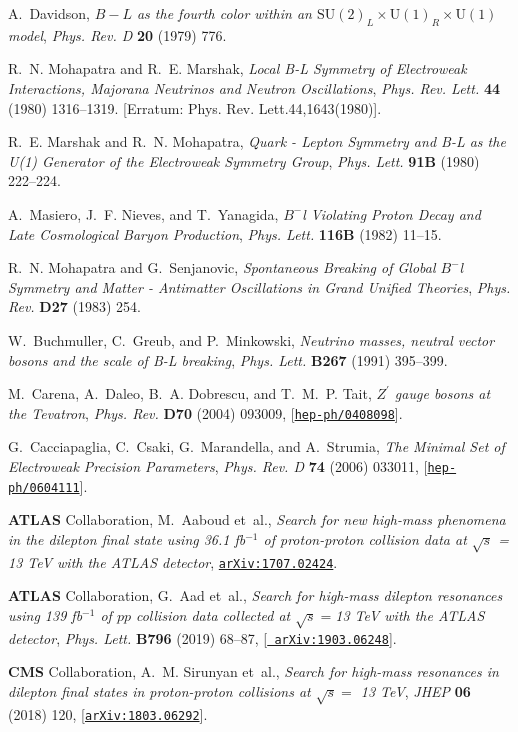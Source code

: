 \documentclass[prd,nofootinbib,preprint,superscriptaddress]{revtex4}
\begin{document}
\begin{thebibliography}{100}
A.~Davidson, {\it {$B−L$ as the fourth color within an $\mathrm{SU}(2)_L
  \times \mathrm{U}(1)_R \times \mathrm{U}(1)$ model}},  {\em Phys. Rev. D}
  {\bf 20} (1979) 776.

R.~N. Mohapatra and R.~E. Marshak, {\it {Local B-L Symmetry of Electroweak
  Interactions, Majorana Neutrinos and Neutron Oscillations}},  {\em Phys. Rev.
  Lett.} {\bf 44} (1980) 1316--1319. [Erratum: Phys. Rev. Lett.44,1643(1980)].

R.~E. Marshak and R.~N. Mohapatra, {\it {Quark - Lepton Symmetry and B-L as the
  U(1) Generator of the Electroweak Symmetry Group}},  {\em Phys. Lett.} {\bf
  91B} (1980) 222--224.

A.~Masiero, J.~F. Nieves, and T.~Yanagida, {\it {$B^-$l Violating Proton Decay
  and Late Cosmological Baryon Production}},  {\em Phys. Lett.} {\bf 116B}
  (1982) 11--15.

R.~N. Mohapatra and G.~Senjanovic, {\it {Spontaneous Breaking of Global $B^-$l
  Symmetry and Matter - Antimatter Oscillations in Grand Unified Theories}},
  {\em Phys. Rev.} {\bf D27} (1983) 254.

W.~Buchmuller, C.~Greub, and P.~Minkowski, {\it {Neutrino masses, neutral
  vector bosons and the scale of B-L breaking}},  {\em Phys. Lett.} {\bf B267}
  (1991) 395--399.

M.~Carena, A.~Daleo, B.~A. Dobrescu, and T.~M.~P. Tait, {\it {$Z^\prime$ gauge
  bosons at the Tevatron}},  {\em Phys. Rev.} {\bf D70} (2004) 093009,
  [\href{http://arxiv.org/abs/hep-ph/0408098}{{\tt hep-ph/0408098}}].

G.~Cacciapaglia, C.~Csaki, G.~Marandella, and A.~Strumia, {\it {The Minimal Set
  of Electroweak Precision Parameters}},  {\em Phys. Rev. D} {\bf 74} (2006)
  033011, [\href{http://arxiv.org/abs/hep-ph/0604111}{{\tt hep-ph/0604111}}].

{\bf ATLAS} Collaboration, M.~Aaboud et~al., {\it {Search for new high-mass
  phenomena in the dilepton final state using 36.1 fb$^{-1}$ of proton-proton
  collision data at $\sqrt{s}$ = 13 TeV with the ATLAS detector}},
  \href{http://arxiv.org/abs/1707.02424}{{\tt arXiv:1707.02424}}.

{\bf ATLAS} Collaboration, G.~Aad et~al., {\it {Search for high-mass dilepton
  resonances using 139 fb$^{-1}$ of $pp$ collision data collected at
  $\sqrt{s}=$13 TeV with the ATLAS detector}},  {\em Phys. Lett.} {\bf B796}
  (2019) 68--87, [\href{http://arxiv.org/abs/1903.06248}{{\tt
  arXiv:1903.06248}}].

{\bf CMS} Collaboration, A.~M. Sirunyan et~al., {\it {Search for high-mass
  resonances in dilepton final states in proton-proton collisions at
  $\sqrt{s}=$ 13 TeV}},  {\em JHEP} {\bf 06} (2018) 120,
  [\href{http://arxiv.org/abs/1803.06292}{{\tt arXiv:1803.06292}}].

\end{thebibliography}\endgroup
\end{document}
